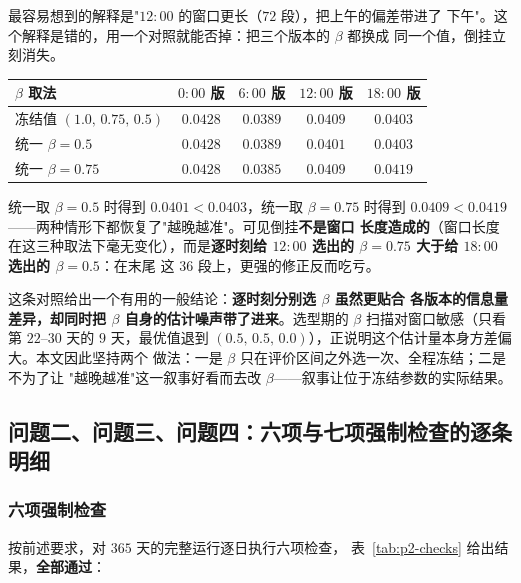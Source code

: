 最容易想到的解释是"$12{:}00$ 的窗口更长（$72$ 段），把上午的偏差带进了
下午"。这个解释是错的，用一个对照就能否掉：把三个版本的 $\beta$ 都换成
同一个值，倒挂立刻消失。
\begin{center}
\footnotesize
\begin{tabular}{lcccc}
  \toprule
  $\beta$ 取法 & $0{:}00$ 版 & $6{:}00$ 版 & $12{:}00$ 版 & $18{:}00$ 版 \\
  \midrule
  冻结值 $(1.0,\,0.75,\,0.5)$ & $0.0428$ & $0.0389$ & $0.0409$ & $0.0403$ \\
  统一 $\beta=0.5$             & $0.0428$ & $0.0389$ & $0.0401$ & $0.0403$ \\
  统一 $\beta=0.75$            & $0.0428$ & $0.0385$ & $0.0409$ & $0.0419$ \\
  \bottomrule
\end{tabular}
\end{center}
统一取 $\beta=0.5$ 时得到 $0.0401<0.0403$，统一取 $\beta=0.75$ 时得到
$0.0409<0.0419$——两种情形下都恢复了"越晚越准"。可见倒挂\textbf{不是窗口
长度造成的}（窗口长度在这三种取法下毫无变化），而是\textbf{逐时刻给
$12{:}00$ 选出的 $\beta=0.75$ 大于给 $18{:}00$ 选出的 $\beta=0.5$}：在末尾
这 $36$ 段上，更强的修正反而吃亏。

这条对照给出一个有用的一般结论：\textbf{逐时刻分别选 $\beta$ 虽然更贴合
各版本的信息量差异，却同时把 $\beta$ 自身的估计噪声带了进来}。选型期的
$\beta$ 扫描对窗口敏感（只看第 $22$--$30$ 天的 $9$ 天，最优值退到
$(0.5,\,0.5,\,0.0)$），正说明这个估计量本身方差偏大。本文因此坚持两个
做法：一是 $\beta$ 只在评价区间之外选一次、全程冻结；二是不为了让
"越晚越准"这一叙事好看而去改 $\beta$——叙事让位于冻结参数的实际结果。

\subsection{问题二、问题三、问题四：六项与七项强制检查的逐条明细}
\label{app:checks}

\subsubsection{六项强制检查}

按前述要求，对 $365$ 天的完整运行逐日执行六项检查，
表~\ref{tab:p2-checks} 给出结果，\textbf{全部通过}：

